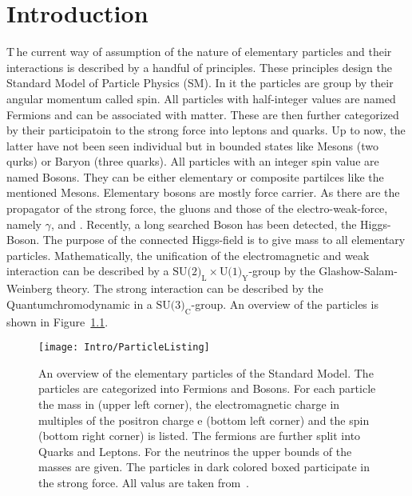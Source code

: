 \chapter{Introduction \label{sec:Intro}}

\lettrine[lines=2]{T}{\,}he current way of assumption of the nature of elementary particles and their interactions is described by a handful of principles. These principles design the Standard Model of Particle Physics (SM). In it the particles are group by their angular momentum called spin. All particles with half-integer values are named Fermions and can be associated with matter. These are then further categorized by their participatoin to the strong force into leptons and quarks. Up to now, the latter have not been seen individual but in bounded states like Mesons (two qurks) or Baryon (three quarks). All particles with an integer spin value are named Bosons. They can be either elementary or composite partilces like the mentioned Mesons. Elementary bosons are mostly force carrier. As there are the propagator of the strong force, the gluons and those of the electro-weak-force, namely $\gamma{}$, \Zz{} and \Wpm{}. Recently, a long searched Boson has been detected, the Higgs-Boson. The purpose of the connected Higgs-field is to give mass to all elementary particles. Mathematically, the unification of the electromagnetic and weak interaction can be described by a $\textrm{SU(2)}_{\textrm{L}} \times \textrm{U(1)}_{\textrm{Y}}$-group by the Glashow-Salam-Weinberg theory. The strong interaction can be described by the Quantumchromodynamic in a $\textrm{SU(3)}_{\textrm{C}}$-group. An overview of the particles is shown in Figure~\ref{plot:IntroParticles}.

\begin{figure}[!htb]
  \centering
  \texttt{[image: Intro/ParticleListing]}
  \caption[Overview over the elementary particles]{An overview of the elementary particles of the Standard Model. The particles are categorized into Fermions and Bosons. For each particle the mass in \MeVcc (upper left corner), the electromagnetic charge in multiples of the positron charge e (bottom left corner) and the spin (bottom right corner) is listed. The fermions are further split into Quarks and Leptons. For the neutrinos the upper bounds of the masses are given. The particles in dark colored boxed participate in the strong force. All valus are taken from~. \label{plot:IntroParticles} }
\end{figure}


